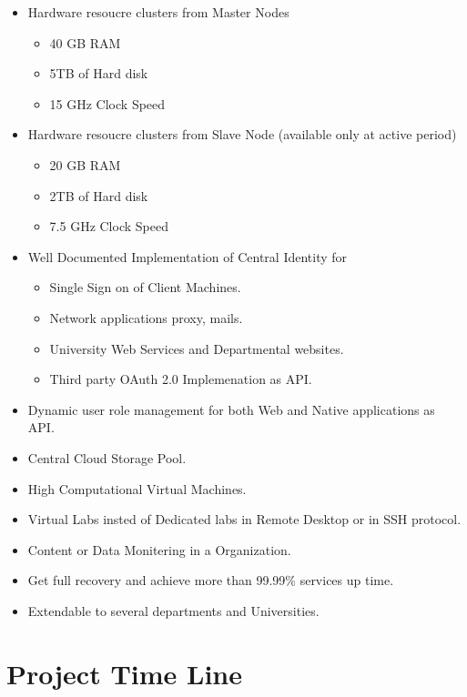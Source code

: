 \documentclass[12pt]{report}
\begin{document}
	\begin{itemize}	
	\item Hardware resoucre clusters from Master Nodes
	 \begin{itemize}
	 	\item 40 GB RAM
		\item 5TB of Hard disk
		\item 15 GHz Clock Speed	
	 \end{itemize}
		
	\item Hardware resoucre clusters from Slave Node (available only at active period)
	 \begin{itemize}
	 	\item 20 GB RAM
		\item 2TB of Hard disk
		\item 7.5 GHz Clock Speed	
	 \end{itemize}
	 
	\item Well Documented Implementation of Central Identity for 
	 \begin{itemize}
	 	\item Single Sign on of Client Machines.
	 	\item Network applications proxy, mails.
	 	\item University Web Services and Departmental websites.
	 	\item Third party OAuth 2.0 Implemenation as API. 
	 \end{itemize}
	\item Dynamic user role management for both Web and Native applications as API.
	\item Central Cloud Storage Pool.
	\item High Computational Virtual Machines.
	\item Virtual Labs insted of Dedicated labs in Remote Desktop or in SSH protocol.
	\item Content or Data Monitering in a Organization.
	\item Get full recovery and achieve more than 99.99\% services up time.
	\item Extendable to several departments and Universities.
	
	\end{itemize}
	
\pagebreak
\section{Project Time Line}
\end{document}
